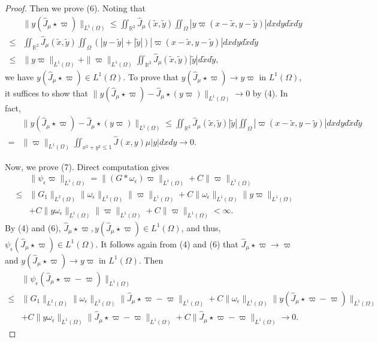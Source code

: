 \documentclass[1 [leqno, 11pt]{amsart}
\numberwithin{equation}{section}
\let\ep=\epsilon
\begin{document}
\begin{CJK*}{GBK}{song}
\begin{appendix}
\begin{proof}
Then we prove (6). Noting that
\begin{align}\nonumber
&\|y(\hat J_{\mu}\star\varpi)\|_{L^1(\Omega)}\leq\iint_{\mathbb{R}^2}\hat J_\mu(\tilde x,\tilde y)\iint_{\Omega}|y\varpi(x-\tilde x,y-\tilde y)|dxdyd\tilde x d\tilde y\\\nonumber
\leq&\iint_{\mathbb{R}^2}\hat J_\mu(\tilde x,\tilde y)\iint_{\Omega}(|y-\tilde y|+|\tilde y|) |\varpi(x-\tilde x,y-\tilde y)|dxdyd\tilde x d\tilde y\\\nonumber
\leq&\|y\varpi\|_{L^1(\Omega)}+\|\varpi\|_{L^1(\Omega)}\iint_{\mathbb{R}^2}\hat J_\mu(\tilde x,\tilde y)|\tilde y|d\tilde x d\tilde y,
\end{align}
we have $y(\hat J_{\mu}\star\varpi)\in L^1(\Omega)$. To prove that $y(\hat J_{\mu}\star\varpi)\to y\varpi$ in $L^1(\Omega)$, it suffices to show that
$\|y(\hat J_{\mu}\star\varpi)-\hat J_{\mu}\star(y\varpi)\|_{L^1(\Omega)}\to0$ by (4). In fact,
\begin{align*}
&\|y(\hat J_{\mu}\star\varpi)-\hat J_{\mu}\star(y\varpi)\|_{L^1(\Omega)}\leq\iint_{\mathbb{R}^2}\hat J_\mu(\tilde x,\tilde y)|\tilde y|\iint_{\Omega} |\varpi(x-\tilde x,y-\tilde y)|dxdyd\tilde xd\tilde y\\
=&\|\varpi\|_{L^1(\Omega)}\iint_{x^2+y^2\leq1}\hat J(x,y)\mu|y|dxdy\to0.
\end{align*}

Now, we prove (7). Direct computation gives
\begin{align}\nonumber
&\|\psi_\ep\varpi\|_{L^1(\Omega)}=\|(G*\omega_\ep) \varpi\|_{L^1(\Omega)}+C\| \varpi\|_{L^1(\Omega)}\\\nonumber
\leq&\|G_1\|_{L^2(\Omega)}\|\omega_\ep\|_{L^2(\Omega)}\|\varpi\|_{L^1(\Omega)}
+C\|\omega_\ep\|_{L^1(\Omega)}\|y\varpi\|_{L^1(\Omega)}\\\label{psi-tilde-omegaL1}
&+C\|y\omega_\ep\|_{L^1(\Omega)}\|\varpi\|_{L^1(\Omega)}+C\| \varpi\|_{L^1(\Omega)}<\infty.
\end{align}
By (4) and (6), $\hat J_{\mu}\star\varpi,y(\hat J_{\mu}\star\varpi)\in L^1(\Omega)$, and thus, $\psi_\ep(\hat J_{\mu}\star\varpi)\in L^1(\Omega)$. It follows again from (4) and (6) that $\hat J_{\mu}\star\varpi\to\varpi$ and $y(\hat J_{\mu}\star\varpi)\to y\varpi$ in $L^1(\Omega)$. Then
\begin{align*}
&\|\psi_\ep(\hat J_{\mu}\star\varpi-\varpi)\|_{L^1(\Omega)}\\
\leq&\|G_1\|_{L^2(\Omega)}\|\omega_\ep\|_{L^2(\Omega)}\|\hat J_{\mu}\star\varpi-\varpi\|_{L^1(\Omega)}+C\|\omega_\ep\|_{L^1(\Omega)}
\|y (\hat J_{\mu}\star\varpi-\varpi)\|_{L^1(\Omega)}\\
&+C\|y\omega_\ep\|_{L^1(\Omega)}\|\hat J_{\mu}\star\varpi-\varpi\|_{L^1(\Omega)}+C\|\hat J_{\mu}\star\varpi-\varpi\|_{L^1(\Omega)}\to 0.
\end{align*}


\end{proof}
\end{appendix}
\end{CJK*}
\end{document}
